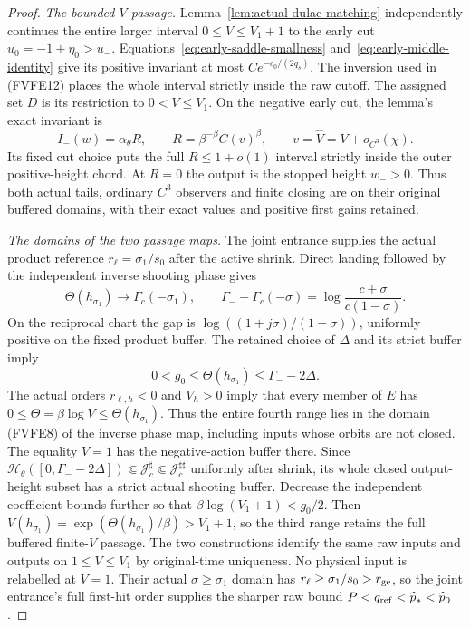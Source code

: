 \begin{proof}
\emph{The bounded-\(V\) passage.}
Lemma~\ref{lem:actual-dulac-matching} independently continues the
entire larger interval $0\le V\le V_1+1$ to the early cut
$u_0=-1+\eta_0>u_-$. Equations~\eqref{eq:early-saddle-smallness}
and~\eqref{eq:early-middle-identity} give its positive invariant
at most $Ce^{-c_0/(2q_s)}$. The inversion used in (FVFE12) places the whole interval strictly
inside the raw cutoff.
The assigned set \(D\) is its restriction to \(0<V\le V_1\).
On the negative early cut, the lemma's exact invariant is
\[
 I_-(w)=\alpha_\theta R,\qquad
 R=\beta^{-\beta}C(v)^\beta,\qquad
 v=\widehat V=V+o_{C^3}(\chi).                 \tag{FVFE14}
\]
Its fixed cut choice puts the full $R\le1+o(1)$ interval strictly
inside the outer positive-height chord. At $R=0$ the output is the
stopped height $w_->0$. Thus both actual tails, ordinary $C^3$
observers and finite closing are on their original buffered domains,
with their exact values and positive first gains retained.

\emph{The domains of the two passage maps.}
The joint entrance supplies the actual product reference
\(r_\ell=\sigma_1/s_0\) after the active shrink.
Direct landing followed by the independent inverse shooting phase
gives
\[
 \Theta(h_{\sigma_1})\longrightarrow\Gamma_c(-\sigma_1),
 \qquad
 \Gamma_- -\Gamma_c(-\sigma)
      =\log{\frac{c+\sigma}{c(1-\sigma)}} .
 \tag{FVFE15}
\]
On the reciprocal chart the gap is
\(\log((1+j\sigma)/(1-\sigma))\), uniformly positive on the fixed
product buffer. The retained choice of \(\Delta\) and its strict
buffer imply
\[
 0<g_0\le\Theta(h_{\sigma_1})\le\Gamma_- -2\Delta .
 \tag{FVFE16}
\]
The actual orders \(r_{\ell,h}<0\) and \(V_h>0\) imply that every
member of \(E\) has \(0\le\Theta=\beta\log V\le\Theta(h_{\sigma_1})\).
Thus the entire fourth range lies in the domain (FVFE8) of the inverse
phase map, including inputs whose orbits are not closed. The equality \(V=1\) has the
negative-action buffer there. Since
\(\mathcal H_\theta([0,\Gamma_- -2\Delta])
\Subset\mathcal J_c^\sharp\Subset\mathcal J_c^{\sharp\sharp}\)
uniformly after shrink, its whole closed output-height subset has
a strict actual shooting buffer.
Decrease the independent coefficient bounds further so that
\(\beta\log(V_1+1)<g_0/2\). Then
\(V(h_{\sigma_1})=\exp(\Theta(h_{\sigma_1})/\beta)>V_1+1\),
so the third range retains the full buffered finite-\(V\) passage.
The two constructions identify the same raw inputs and outputs on \(1\le V\le V_1\) by original-time uniqueness.
No physical input is relabelled at \(V=1\).
Their actual \(\sigma\ge\sigma_1\) domain has
\(r_\ell\ge\sigma_1/s_0>r_{\rm ge}\), so the joint entrance's full
first-hit order supplies the sharper raw bound
\(P<q_{\rm ref}<\widehat p_*<\widehat p_0\).


\end{proof}
